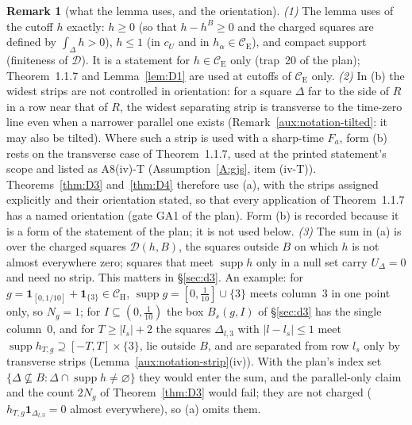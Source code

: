 \documentclass[11pt,a4paper]{article}
\theoremstyle{plain}
\theoremstyle{definition}
\theoremstyle{plain}
\theoremstyle{definition}
\newtheorem{auxrem}[auxlemma]{Remark}
\newcommand{\CE}{\mathcal{C}_{\mathrm E}}
\newcommand{\CH}{\mathcal{C}_{\mathrm H}}
\DeclareMathOperator{\supp}{supp}
\begin{document}
\begin{auxrem}[what the lemma uses, and the orientation]\label{aux:d2-uses}
\emph{(1)} The lemma uses of the cutoff $h$ exactly: $h\ge0$ (so that $h-h^B\ge0$ and the
charged squares are defined by $\int_\Delta h>0$), $h\le1$ (in $c_U$ and in $h_\alpha\in\CE$),
and compact support (finiteness of $\mathcal D$).  It is a statement for $h\in\CE$ only
(trap~20 of the plan); Theorem~1.1.7 and Lemma~\ref{lem:D1} are used at cutoffs of $\CE$ only.
\emph{(2)} In (b) the widest strips are not controlled in orientation: for a square $\Delta$
far to the side of $R$ in a row near that of $R$, the widest separating strip is transverse to
the time-zero line even when a narrower parallel one exists (Remark~\ref{aux:notation-tilted}:
it may also be tilted).  Where such a strip is used with a sharp-time $F_a$, form (b) rests on
the transverse case of Theorem~1.1.7, used at the printed statement's scope and listed as A8(iv)-T
(Assumption~\ref{A:gjs}, item (iv-T)).  Theorems~\ref{thm:D3} and~\ref{thm:D4} therefore use (a), with the
strips assigned explicitly and their orientation stated, so that every application of
Theorem~1.1.7 has a named orientation (gate GA1 of the plan).  Form (b) is recorded because it is a form of
the statement of the plan; it is not used below.
\emph{(3)} The sum in (a) is over the charged squares $\mathcal D(h,B)$, the squares outside $B$
on which $h$ is not almost everywhere zero; squares that meet $\supp h$ only in a null set carry
$U_\Delta=0$ and need no strip.  This matters in \S\ref{sec:d3}.  An example: for $g=\mathbf 1_{[0,1/10]}+\mathbf 1_{\{3\}}\in\CH$, $\supp g=[0,\frac1{10}]\cup
\{3\}$ meets column~$3$ in one point only, so $N_g=1$; for $I\subseteq(0,\frac1{10})$ the box
$B_s(g,I)$ of \S\ref{sec:d3} has the single column~$0$, and for $T\ge|l_s|+2$ the squares
$\Delta_{l,3}$ with $|l-l_s|\le1$ meet $\supp h_{T,g}\supseteq[-T,T]\times\{3\}$, lie outside $B$,
and are separated from row $l_s$ only by transverse strips (Lemma~\ref{aux:notation-strip}(iv)).
With the plan's index set $\{\Delta\not\subseteq B:\Delta\cap\supp h\ne\varnothing\}$ they would
enter the sum, and the parallel-only claim and the count $2N_g$ of Theorem~\ref{thm:D3} would
fail; they are not charged ($h_{T,g}\mathbf 1_{\Delta_{l,3}}=0$ almost everywhere), so (a) omits
them.
\end{auxrem}
\end{document}
